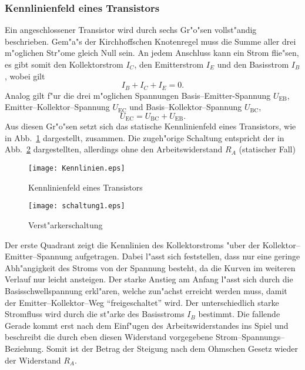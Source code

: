 \documentclass[a4paper,10pt]{article}
\begin{document}
\subsubsection*{Kennlinienfeld eines Transistors}
Ein angeschlossener Transistor wird durch sechs Gr"o"sen vollst"andig beschrieben. Gem"a"s der Kirchhoffschen Knotenregel muss die Summe aller drei m"oglichen Str"ome gleich Null sein. An jedem Anschluss kann ein Strom flie"sen, es gibt somit den Kollektorstrom $I_C$, den Emitterstrom $I_E$ und den Basisstrom $I_B$, wobei gilt
\begin{equation}
I_B + I_C + I_E = 0.
\end{equation}
Analog gilt f"ur die drei m"oglichen Spannungen Basis--Emitter-Spannung $U_\text{EB}$, Emitter--Kollektor--Spannung $U_\text{EC}$ und Basis--Kollektor--Spannung $U_\text{BC}$,
\begin{equation}
U_\text{EC} = U_\text{BC} + U_\text{EB}.
\end{equation}
Aus diesen Gr"o"sen setzt sich das statische Kennlinienfeld eines Transistors, wie in Abb.~\ref{kenn} dargestellt, zusammen. Die zugeh"orige Schaltung entspricht der in Abb.~\ref{schalt1} dargestellten, allerdings ohne den Arbeitswiderstand $R_A$ (statischer Fall)

\begin{figure}[htb]
	\centering
	\texttt{[image: Kennlinien.eps]}
	\caption{Kennlinienfeld eines Transistors}
	\label{kenn}
\end{figure}

\begin{figure}[htb]
	\centering
	\texttt{[image: schaltung1.eps]}
	\caption{Verst"arkerschaltung}
	\label{schalt1}
\end{figure}


Der erste Quadrant zeigt die Kennlinien des Kollektorstroms "uber der Kollektor--Emitter--Spannung aufgetragen. Dabei l"asst sich feststellen, dass nur eine geringe Abh"angigkeit des Stroms von der Spannung besteht, da die Kurven im weiteren Verlauf nur leicht ansteigen. Der starke Anstieg am Anfang l"asst sich durch die Basisschwellspannung erkl"aren, welche zun"achst erreicht werden muss, damit der Emitter--Kollektor--Weg "`freigeschaltet"' wird. Der unterschiedlich starke Stromfluss wird durch die st"arke des Basisstroms $I_B$ bestimmt. Die fallende Gerade kommt erst nach dem Einf"ugen des Arbeitswiderstandes ins Spiel und beschreibt die durch eben diesen Widerstand vorgegebene Strom--Spannungs--Beziehung. Somit ist der Betrag der Steigung nach dem Ohmschen Gesetz wieder der Widerstand $R_A$.
\end{document}
